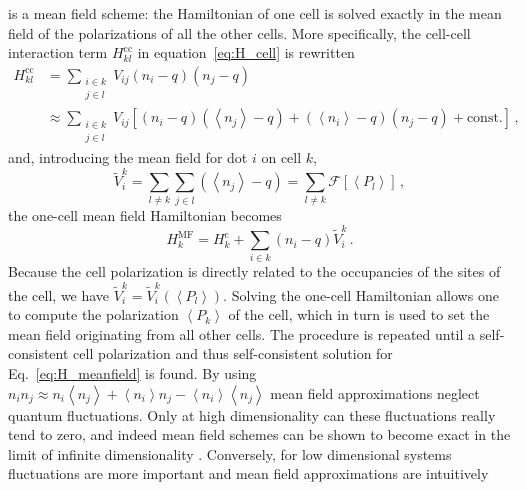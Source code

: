 %
 is a mean field scheme: the Hamiltonian of one cell is solved
exactly in the mean field of the polarizations of all the other cells. More
specifically, the cell-cell interaction term $H^\text{cc}_{kl}$ in
equation~\eqref{eq:H_cell} is rewritten
\begin{equation}
\begin{split}
  \label{eq:H_kl_meanfield}
  H^\text{cc}_{kl} 
  &=
  \sum_{\substack{i \in k\\j \in l}} V_{ij} \left( n_i - q \right) \left( n_j - q \right) \\
  &\approx
  \sum_{\substack{i \in k\\j \in l}} V_{ij} 
       \left[ \left( n_i - q \right) \left( \left< n_j \right> - q \right)
              +
              \left( \left< n_i \right> - q \right) \left( n_j - q \right)
              +
              \text{const.}
       \right] \, ,
\end{split}
\end{equation}
and, introducing the mean field for dot $i$ on cell $k$,
\begin{equation}
  \label{eq:V_meanfield}
  \tilde{V}_i^k
  = \sum_{l \ne k} \sum_{j \in l} \left( \left< n_j \right> - q \right)
  = \sum_{l \ne k} \mathcal{F} \left[ \left< P_l \right> \right] \, ,
\end{equation}
the one-cell mean field Hamiltonian becomes
\begin{equation}
  \label{eq:H_meanfield}
  H^{\mathrm{MF}}_k
  = H^\text{c}_k + \sum_{i \in k} \left( n_i - q \right) \tilde{V}_i^k \, .
\end{equation}
Because the cell polarization is directly related to the occupancies of the
sites of the cell, we have $\tilde{V}_i^k = \tilde{V}_i^k(\left<P_l\right>)$.
Solving the one-cell Hamiltonian allows one to compute the polarization $\left<
P_k \right>$ of the cell, which in turn is used to set the mean field
originating from all other cells. The procedure is repeated until a
self-consistent cell polarization and thus self-consistent solution for
Eq.~\eqref{eq:H_meanfield} is found. By using
$n_i n_j \approx n_i \left< n_j \right> + \left< n_i \right> n_j - 
\left< n_i \right> \left< n_j \right>$
mean field approximations neglect quantum
fluctuations. Only at high dimensionality can these fluctuations really tend to
zero, and indeed mean field schemes can be shown to become exact in the limit of
infinite dimensionality \cite{Fehske}. Conversely, for low dimensional systems
fluctuations are more important and mean field approximations are intuitively
